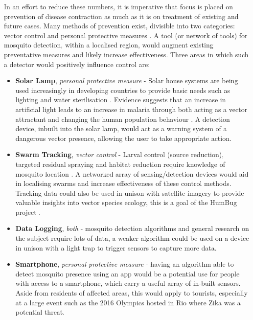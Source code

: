         In an effort to reduce these numbers, it is imperative that focus is placed on prevention of disease contraction as much as it is on treatment of existing and future cases. Many methods of prevention exist, divisible into two categories: vector control and personal protective measures \cite{Caraballo2014}. A tool (or network of tools) for mosquito detection, within a localised region, would augment existing preventative measures and likely increase effectiveness. Three areas in which such a detector would positively influence control are:
        \begin{itemize}
            \item{\textbf{Solar Lamp}, \textit{personal protective measure} - Solar house systems are being used increasingly in developing countries to provide basic needs such as lighting and water sterilisation \cite{Akikur2013}. Evidence suggests that an increase in artificial light leads to an increase in malaria through both acting as a vector attractant and changing the human population behaviour \cite{Barghini2010}. A detection device, inbuilt into the solar lamp, would act as a warning system of a dangerous vector presence, allowing the user to take appropriate action.}
            \item{\textbf{Swarm Tracking}, \textit{vector control} - Larval control (source reduction), targeted residual spraying and habitat reduction require knowledge of mosquito location \cite{Caraballo2014,Pates2005,WHOVectorControl2016}. A networked array of sensing/detection devices would aid in localising swarms and increase effectiveness of these control methods. Tracking data could also be used in unison with satellite imagery to provide valuable insights into vector species ecology, this is a goal of the HumBug project \cite{HumBug2016}.}
            \item{\textbf{Data Logging}, \textit{both} - mosquito detection algorithms and general research on the subject require lots of data, a weaker algorithm could be used on a device in unison with a light trap to trigger sensors to capture more data.}
            \item{\textbf{Smartphone}, \textit{personal protective measure} - having an algorithm able to detect mosquito presence using an app would be a potential use for people with access to a smartphone, which carry a useful array of in-built sensors. Aside from residents of affected areas, this would apply to tourists, especially at a large event such as the 2016 Olympics hosted in Rio where Zika was a potential threat.}
        \end{itemize}
